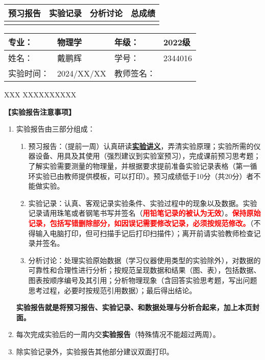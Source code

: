 \documentclass[dvipsnames, svgnames,a4paper,11pt]{article}
\begin{document}
\begin{table}
	\renewcommand\arraystretch{1.7}
	\begin{tabularx}{\textwidth}{
		|X|X|X|X
		|X|X|X|X|}
	\hline
	\multicolumn{2}{|c|}{预习报告}&\multicolumn{2}{|c|}{实验记录}&\multicolumn{2}{|c|}{分析讨论}&\multicolumn{2}{|c|}{总成绩}\\
	\hline
	& & & & & & & \\
	\hline
	\end{tabularx}
\end{table}


\begin{table}
	\renewcommand\arraystretch{1.7}
	\begin{tabularx}{\textwidth}{|X|X|X|X|}
	\hline
	专业：& 物理学 &年级：& 2022级\\
	\hline
	姓名：& 戴鹏辉  & 学号： & 2344016 \\
	\hline
	实验时间：& 2024/XX/XX & 教师签名：& \\
	\hline
	\end{tabularx}
\end{table}

\begin{center}
	\LARGE XXX \quad XXXXXXXXXX
\end{center}

\textbf{【实验报告注意事项】}
\begin{enumerate}
	\item 实验报告由三部分组成：
	\begin{enumerate}
		\item 预习报告：（提前一周）认真研读\underline{\textbf{实验讲义}}，弄清实验原理；实验所需的仪器设备、用具及其使用（强烈建议到实验室预习），完成课前预习思考题；了解实验需要测量的物理量，并根据要求提前准备实验记录表格（第一循环实验已由教师提供模板，可以打印）。预习成绩低于10分（共20分）者不能做实验。
	    \item 实验记录：认真、客观记录实验条件、实验过程中的现象以及数据。实验记录请用珠笔或者钢笔书写并签名（\textcolor{red}{\textbf{用铅笔记录的被认为无效}}）。\textcolor{red}{\textbf{保持原始记录，包括写错删除部分，如因误记需要修改记录，必须按规范修改。}}（不得输入电脑打印，但可扫描手记后打印扫描件）；离开前请实验教师检查记录并签名。
	    \item 分析讨论：处理实验原始数据（学习仪器使用类型的实验除外），对数据的可靠性和合理性进行分析；按规范呈现数据和结果（图、表），包括数据、图表按顺序编号及其引用；分析物理现象（含回答实验思考题，写出问题思考过程，必要时按规范引用数据）；最后得出结论。
	\end{enumerate}
	\textbf{实验报告就是将预习报告、实验记录、和数据处理与分析合起来，加上本页封面。}
	\item 每次完成实验后的一周内交\textbf{实验报告}（特殊情况不能超过两周）。
	\item 除实验记录外，实验报告其他部分建议双面打印。
\end{enumerate}
\end{document}
